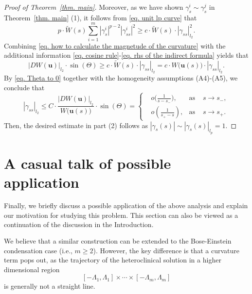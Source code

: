 \documentclass[11pt,twoside,reqno]{amsart}
\newcounter{assu}
\numberwithin{equation}{section}
\begin{document}
\begin{proof}[Proof of Theorem~\ref{thm. main}]
Moreover, as we have shown $\gamma_{s}^{i}\sim\gamma_{s}^{j}$ in Theorem~\ref{thm. main} (1), it follows from \eqref{eq. unit lp curve} that
\begin{equation}\label{eq. rhs of the indirect formula}
    p\cdot\widetilde{W}(s)\sum_{i=1}^{m}|\gamma^{i}_{s}|^{p-2}|\gamma^{i}_{ss}|^{2}\geq c\cdot\widetilde{W}(s)\cdot|\gamma_{ss}|_{l_{2}}^{2}.
\end{equation}
Combining \eqref{eq. how to calculate the magnetude of the curvature} with the additional information \eqref{eq. cosine rule}-\eqref{eq. rhs of the indirect formula} yields that
\begin{equation*}
    |DW(\mathbf{u})|_{l_{2}}\cdot\sin{(\Theta)}\geq c\cdot\widetilde{W}(s)\cdot|\gamma_{ss}|_{l_{2}}=c\cdot W\big(\mathbf{u}(s)\big)\cdot|\gamma_{ss}|_{l_{2}}.
\end{equation*}
By \eqref{eq. Theta to 0} together with the homogeneity assumptions (A4)-(A5), we conclude that
\begin{equation*}
    |\gamma_{ss}|_{l_{2}}\leq C\cdot\frac{|DW(\mathbf{u})|_{l_{2}}}{W\big(\mathbf{u}(s)\big)}\cdot\sin{(\Theta)}=\left\{\begin{aligned}
        &o\big(\frac{1}{s-s_{-}}\big),&\mbox{as }&s\to s_{-},\\
        &o(\frac{1}{s_{+}-s}),&\mbox{as }&s\to s_{+}.
    \end{aligned}\right.
\end{equation*}
Then, the desired estimate in part (2) follows as $|\gamma_{s}(s)|\sim|\gamma_{s}(s)|_{l_{p}}=1$.
\end{proof}

\section{A casual talk of possible application}\label{sec. casual talk}
Finally, we briefly discuss a possible application of the above analysis and explain our motivation for studying this problem. This section can also be viewed as a continuation of the discussion in the Introduction.

We believe that a similar construction can be extended to the Bose-Einstein condensation case (i.e., $m\geq2$). However, the key difference is that a curvature term pops out, as the trajectory of the heteroclinical solution in a higher dimensional region \[
[-\Lambda_{1},\Lambda_{1}]\times\cdots\times[-\Lambda_{m},\Lambda_{m}]
\] is generally not a straight line.
\end{document}
